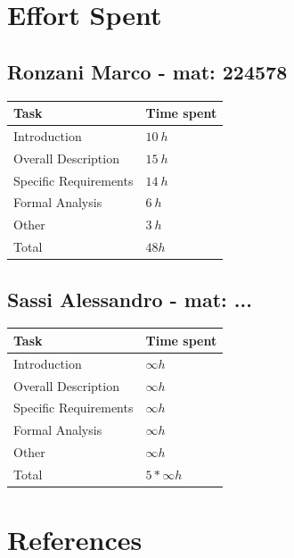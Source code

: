 \documentclass[11pt]{article}
\begin{document}
\section{Effort Spent}
\label{section:effort}

\subsection{Ronzani Marco - mat: 224578}

\begin{tabular}{|l|l|}
    \hline
    \textbf{Task} & \textbf{Time spent} \\
    \hline
    Introduction & $10\ h$ \\
    \hline
    Overall Description & $15\ h$ \\
    \hline
    Specific Requirements & $14\ h$ \\
    \hline
    Formal Analysis & $6\ h$ \\
    \hline
    Other & $3\ h$ \\
    \hline
    \hline
    Total & $48 h$ \\
    \hline
\end{tabular}

\subsection{Sassi Alessandro - mat: ...}

\begin{tabular}{|l|l|}
    \hline
    \textbf{Task} & \textbf{Time spent} \\
    \hline
    Introduction & $\infty h$ \\
    \hline
    Overall Description & $\infty h$ \\
    \hline
    Specific Requirements & $\infty h$ \\
    \hline
    Formal Analysis & $\infty h$ \\
    \hline
    Other & $\infty h$ \\
    \hline
    \hline
    Total & $5*\infty h$ \\
    \hline
\end{tabular}

\newpage

\section{References}
\label{section:references}
\end{document}
